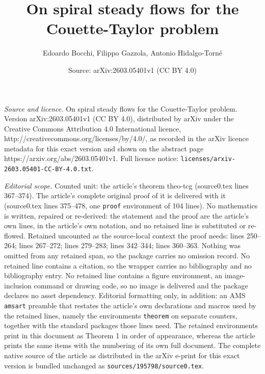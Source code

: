 \documentclass[10pt,a4paper]{amsart}
\title{On spiral steady flows for the Couette-Taylor problem}
\author{Edoardo Bocchi, Filippo Gazzola, Antonio Hidalgo-Torn\'e}
\date{Source: arXiv:2603.05401v1 (CC BY 4.0)}
\begin{document}
\maketitle

\noindent\emph{Source and licence.} On spiral steady flows for the Couette-Taylor problem. Version arXiv:2603.05401v1 (CC BY 4.0), distributed by arXiv under the Creative Commons Attribution 4.0 International licence, http://creativecommons.org/licenses/by/4.0/, as recorded in the arXiv licence metadata for this exact version and shown on the abstract page https://arxiv.org/abs/2603.05401v1. Full licence notice: \texttt{licenses/arxiv-2603.05401-CC-BY-4.0.txt}.\par\smallskip

\noindent\textit{Editorial scope.} Counted unit: the article's theorem theo-tcg (source0.tex lines 367--374). The article's complete original proof of it is delivered with it (source0.tex lines 375--478, one \texttt{proof} environment of 104 lines). No mathematics is written, repaired or re-derived: the statement and the proof are the article's own lines, in the article's own notation, and no retained line is substituted or re-flowed.  Retained uncounted as the source-local context the proof needs: lines 250--264; lines 267--272; lines 279--283; lines 342--344; lines 360--363.  Nothing was omitted from any retained span, so the package carries no omission record.  No retained line contains a citation, so the wrapper carries no bibliography and no bibliography entry.  No retained line contains a figure environment, an image-inclusion command or drawing code, so no image is delivered and the package declares no asset dependency.  Editorial formatting only, in addition: an AMS \texttt{amsart} preamble that restates the article's own declarations and macros used by the retained lines, namely the environments \texttt{theorem} on separate counters, together with the standard packages those lines need.  The retained environments print in this document as Theorem 1 in order of appearance, whereas the article prints the same items with the numbering of its own full document.  The complete native source of the article as distributed in the arXiv e-print for this exact version is bundled unchanged as \texttt{sources/195798/source0.tex}.
\end{document}
